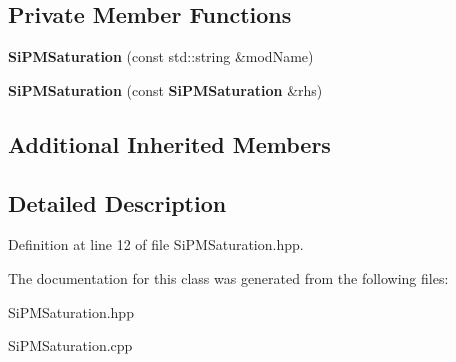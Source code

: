 \subsection*{Private Member Functions}
\begin{DoxyCompactItemize}
\item 
{\bfseries Si\-P\-M\-Saturation} (const std\-::string \&mod\-Name)\label{classdigisim_1_1SiPMSaturation_a35080e707c417dbb1cce6a4681a35ee2}

\item 
{\bfseries Si\-P\-M\-Saturation} (const {\bf Si\-P\-M\-Saturation} \&rhs)\label{classdigisim_1_1SiPMSaturation_a05ba0d472061dbb62bffae1eefbd0450}

\end{DoxyCompactItemize}
\subsection*{Additional Inherited Members}


\subsection{Detailed Description}


Definition at line 12 of file Si\-P\-M\-Saturation.\-hpp.



The documentation for this class was generated from the following files\-:\begin{DoxyCompactItemize}
\item 
Si\-P\-M\-Saturation.\-hpp\item 
Si\-P\-M\-Saturation.\-cpp\end{DoxyCompactItemize}
